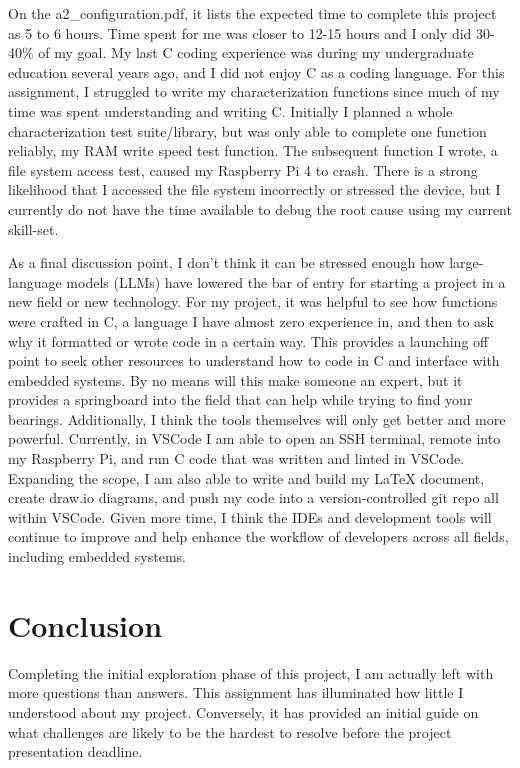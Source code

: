 \documentclass[journal]{IEEEtran}
\begin{document}
    On the a2\_configuration.pdf, it lists the expected time to complete this project as 5 to 6 hours.
    Time spent for me was closer to 12-15 hours and I only did 30-40\% of my goal.
    My last C coding experience was during my undergraduate education several years ago, and I did not enjoy C as a coding language.
    For this assignment, I struggled to write my characterization functions since much of my time was spent understanding and writing C.
    Initially I planned a whole characterization test suite/library, but was only able to complete one function reliably, my RAM write speed test function.
    The subsequent function I wrote, a file system access test, caused my Raspberry Pi 4 to crash.
    There is a strong likelihood that I accessed the file system incorrectly or stressed the device, but I currently do not have the time available to debug the root cause using my current skill-set.  

    As a final discussion point, I don't think it can be stressed enough how large-language models (LLMs) have lowered the bar of entry for starting a project in a new field or new technology.
    For my project, it was helpful to see how functions were crafted in C, a language I have almost zero experience in, and then to ask why it formatted or wrote code in a certain way. 
    This provides a launching off point to seek other resources to understand how to code in C and interface with embedded systems.
    By no means will this make someone an expert, but it provides a springboard into the field that can help while trying to find your bearings.
    Additionally, I think the tools themselves will only get better and more powerful.
    Currently, in VSCode I am able to open an SSH terminal, remote into my Raspberry Pi, and run C code that was written and linted in VSCode. 
    Expanding the scope, I am also able to write and build my LaTeX document, create draw.io diagrams, and push my code into a version-controlled git repo all within VSCode. 
    Given more time, I think the IDEs and development tools will continue to improve and help enhance the workflow of developers across all fields, including embedded systems.

    \section{Conclusion}
    Completing the initial exploration phase of this project, I am actually left with more questions than answers.
    This assignment has illuminated how little I understood about my project.
    Conversely, it has provided an initial guide on what challenges are likely to be the hardest to resolve before the project presentation deadline.
\end{document}
